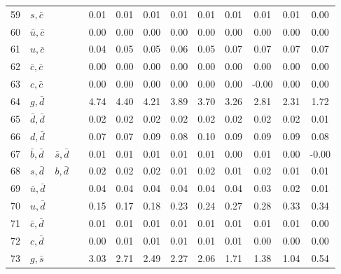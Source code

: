 \begin{tabularx}{\textwidth}{rXXX@{}S@{}S@{}S@{}S@{}S@{}S@{}S@{}S@{}S}
 59 & $s, \bar c$      &                   &                  &  0.01 &  0.01 &  0.01 &  0.01 &  0.01 &  0.01 &  0.01 &  0.01 &  0.00 \\
 60 & $\bar u, \bar c$ &                   &                  &  0.00 &  0.00 &  0.00 &  0.00 &  0.00 &  0.00 &  0.00 &  0.00 &  0.00 \\
 61 & $u, \bar c$      &                   &                  &  0.04 &  0.05 &  0.05 &  0.06 &  0.05 &  0.07 &  0.07 &  0.07 &  0.07 \\
 62 & $\bar c, \bar c$ &                   &                  &  0.00 &  0.00 &  0.00 &  0.00 &  0.00 &  0.00 &  0.00 &  0.00 &  0.00 \\
 63 & $c, \bar c$      &                   &                  &  0.00 &  0.00 &  0.00 &  0.00 &  0.00 &  0.00 & -0.00 &  0.00 &  0.00 \\
 64 & $g, \bar d$      &                   &                  &  4.74 &  4.40 &  4.21 &  3.89 &  3.70 &  3.26 &  2.81 &  2.31 &  1.72 \\
 65 & $\bar d, \bar d$ &                   &                  &  0.02 &  0.02 &  0.02 &  0.02 &  0.02 &  0.02 &  0.02 &  0.02 &  0.01 \\
 66 & $d, \bar d$      &                   &                  &  0.07 &  0.07 &  0.09 &  0.08 &  0.10 &  0.09 &  0.09 &  0.09 &  0.08 \\
 67 & $\bar b, \bar d$ & $\bar s, \bar d$  &                  &  0.01 &  0.01 &  0.01 &  0.01 &  0.01 &  0.00 &  0.01 &  0.00 & -0.00 \\
 68 & $s, \bar d$      & $b, \bar d$       &                  &  0.02 &  0.02 &  0.02 &  0.01 &  0.02 &  0.01 &  0.02 &  0.01 &  0.01 \\
 69 & $\bar u, \bar d$ &                   &                  &  0.04 &  0.04 &  0.04 &  0.04 &  0.04 &  0.04 &  0.03 &  0.02 &  0.01 \\
 70 & $u, \bar d$      &                   &                  &  0.15 &  0.17 &  0.18 &  0.23 &  0.24 &  0.27 &  0.28 &  0.33 &  0.34 \\
 71 & $\bar c, \bar d$ &                   &                  &  0.01 &  0.01 &  0.01 &  0.01 &  0.01 &  0.01 &  0.01 &  0.01 &  0.00 \\
 72 & $c, \bar d$      &                   &                  &  0.00 &  0.01 &  0.01 &  0.01 &  0.01 &  0.01 &  0.00 &  0.00 &  0.00 \\
 73 & $g, \bar s$      &                   &                  &  3.03 &  2.71 &  2.49 &  2.27 &  2.06 &  1.71 &  1.38 &  1.04 &  0.54 \\

\end{tabularx}
